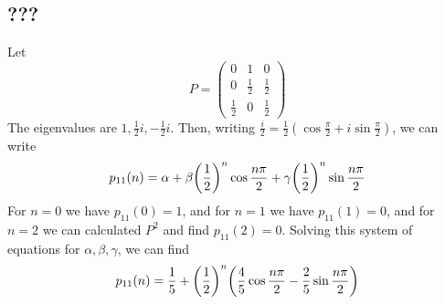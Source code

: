 \subsection{???}
\begin{example}
	Let
	\[
		P = \begin{pmatrix}
			0           & 1           & 0           \\
			0           & \frac{1}{2} & \frac{1}{2} \\
			\frac{1}{2} & 0           & \frac{1}{2}
		\end{pmatrix}
	\]
	The eigenvalues are \( 1, \frac{1}{2}i, -\frac{1}{2}i \).
	Then, writing \( \frac{i}{2} = \frac{1}{2} (\cos \frac{\pi}{2} + i \sin \frac{\pi}{2} ) \), we can write
	\[
		p_{11}(n) = \alpha + \beta \qty(\frac{1}{2})^n \cos \frac{n \pi}{2} + \gamma \qty(\frac{1}{2})^n \sin \frac{n \pi}{2}
	\]
	For \( n = 0 \) we have \( p_{11}(0) = 1 \), and for \( n = 1 \) we have \( p_{11}(1) = 0 \), and for \( n = 2 \) we can calculated \( P^2 \) and find \( p_{11}(2) = 0 \).
	Solving this system of equations for \( \alpha, \beta, \gamma \), we can find
	\[
		p_{11}(n) = \frac{1}{5} + \qty(\frac{1}{2})^n \qty(\frac{4}{5}\cos \frac{n \pi}{2} - \frac{2}{5}\sin \frac{n \pi}{2} )
	\]
\end{example}

